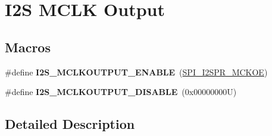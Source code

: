 \hypertarget{group___i2_s___m_c_l_k___output}{}\section{I2S M\+C\+LK Output}
\label{group___i2_s___m_c_l_k___output}
\subsection*{Macros}
\begin{DoxyCompactItemize}
\item 
\mbox{\label{group___i2_s___m_c_l_k___output_gad02b0b79e2a7b8786228bbd902db6266}} 
\#define {\bfseries I2\+S\+\_\+\+M\+C\+L\+K\+O\+U\+T\+P\+U\+T\+\_\+\+E\+N\+A\+B\+LE}~(\hyperlink{group___peripheral___registers___bits___definition_ga25669c3686c0c577d2d371ac09200ff0}{S\+P\+I\+\_\+\+I2\+S\+P\+R\+\_\+\+M\+C\+K\+OE})
\item 
\mbox{\label{group___i2_s___m_c_l_k___output_gad751d9da31ef7b7b63b5a4028331f36d}} 
\#define {\bfseries I2\+S\+\_\+\+M\+C\+L\+K\+O\+U\+T\+P\+U\+T\+\_\+\+D\+I\+S\+A\+B\+LE}~(0x00000000\+U)
\end{DoxyCompactItemize}


\subsection{Detailed Description}
